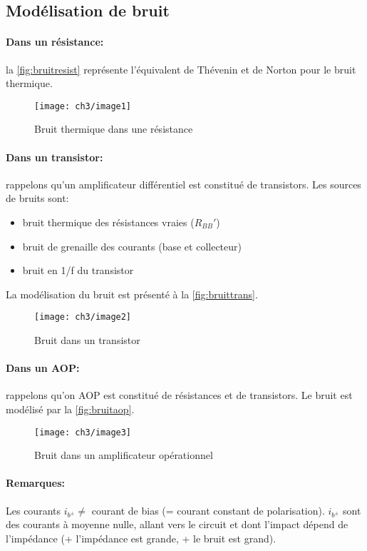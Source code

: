 \subsection{Modélisation de bruit}
\paragraph{Dans un résistance:} la \autoref{fig:bruitresist} représente l'équivalent de Thévenin et de Norton pour le bruit thermique.
\begin{figure}[H] 
	\centering 
	\texttt{[image: ch3/image1]} 
	\caption{Bruit thermique dans une résistance}
	\label{fig:bruitresist}
\end{figure}
\paragraph{Dans un transistor:} rappelons qu'un amplificateur différentiel est constitué de transistors. Les sources de bruits sont:
\begin{itemize}
	\item bruit thermique des résistances vraies ($R_{BB}'$)
	\item bruit de grenaille des courants (base et collecteur)
	\item bruit en 1/f du transistor
\end{itemize}
La modélisation du bruit est présenté à la \autoref{fig:bruittrans}.
\begin{figure}[H] 
	\centering 
	\texttt{[image: ch3/image2]} 
	\caption{Bruit dans un transistor}
	\label{fig:bruittrans}
\end{figure}
\paragraph{Dans un AOP:} rappelons qu'on AOP est constitué de résistances et de transistors. Le bruit est modélisé par la \autoref{fig:bruitaop}.
\begin{figure}[H] 
	\centering 
	\texttt{[image: ch3/image3]} 
	\caption{Bruit dans un amplificateur opérationnel} 
	\label{fig:bruitaop}
\end{figure}
\paragraph{Remarques:} Les courants $i_{b^\pm} \neq$ courant de bias (= courant constant de polarisation). $i_{b^\pm}$ sont des courants à moyenne nulle, allant vers le circuit et dont l'impact dépend de l'impédance (+ l'impédance est grande, + le bruit est grand).
